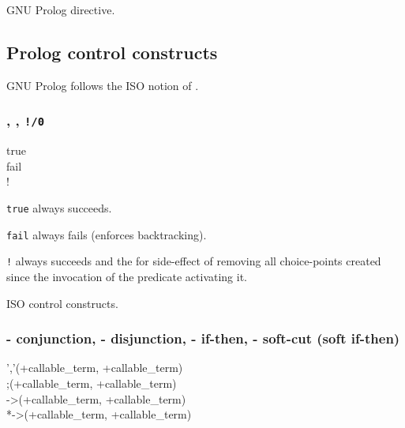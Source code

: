 \Portability

GNU Prolog directive.

\subsection{Prolog control constructs}
\label{control-construct}

GNU Prolog follows the ISO notion of . 

\subsubsection{,
               ,
               \texttt{!/0} \label{true/0}} %

\begin{TemplatesOneCol}
true\\
fail\\
!

\end{TemplatesOneCol}

\Description

\texttt{true} always succeeds.

\texttt{fail} always fails (enforces backtracking).

\texttt{!} always succeeds and the for side-effect of removing all
choice-points created since the invocation of the predicate activating it.

\PlErrorsNone

\Portability

ISO control constructs.

\subsubsection{ - conjunction,
                - disjunction,
                - if-then, 
                - soft-cut (soft if-then)}

\begin{TemplatesOneCol}
','(+callable\_term, +callable\_term)\\
;(+callable\_term, +callable\_term)\\
->(+callable\_term, +callable\_term)\\
{*->}(+callable\_term, +callable\_term)

\end{TemplatesOneCol}

